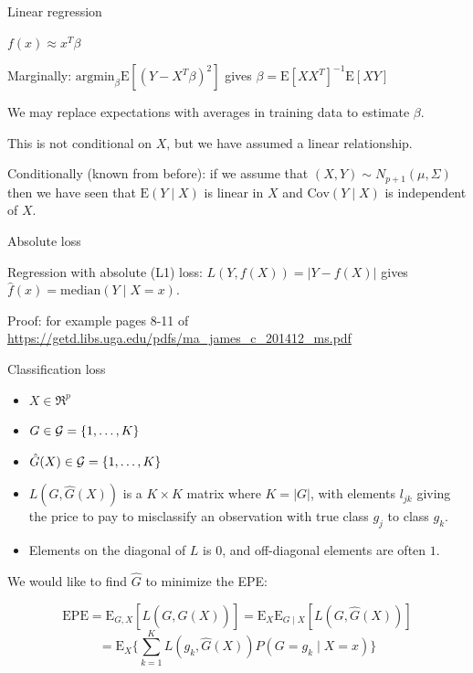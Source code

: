 \documentclass[
  ignorenonframetext,
]{beamer}
\providecommand{\tightlist}{%
  \setlength{\itemsep}{0pt}\setlength{\parskip}{0pt}}
\begin{document}
\begin{frame}

\begin{block}{Linear regression}

\(f(x)\approx x^T \beta\)

Marginally: \(\text{argmin}_{\beta} \text{E}[(Y-X^T\beta)^2]\) gives
\(\beta=\text{E}[X X^T]^{-1}\text{E}[XY]\)

We may replace expectations with averages in training data to estimate
\(\beta\).

This is not conditional on \(X\), but we have assumed a linear
relationship.

Conditionally (known from before): if we assume that
\((X,Y) \sim N_{p+1}(\mu,\Sigma)\) then we have seen that
\(\text{E}(Y\mid X)\) is linear in \(X\) and \(\text{Cov}(Y \mid X)\) is
independent of \(X\).

\end{block}

\end{frame}

\begin{frame}

\begin{block}{Absolute loss}

Regression with absolute (L1) loss: \(L(Y,f(X))=\lvert Y-f(X) \rvert\)
gives \(\hat{f}(x)=\text{median}(Y\mid X=x)\).

Proof: for example pages 8-11 of
\url{https://getd.libs.uga.edu/pdfs/ma_james_c_201412_ms.pdf}

\end{block}

\end{frame}

\begin{frame}

\begin{block}{Classification loss}

\begin{itemize}
\tightlist
\item
  \(X \in \Re^p\)
\item
  \(G \in {\cal G}=\{1,\ldots,K\}\)
\item
  \(\hat{G}(X) \in {\cal G}=\{1,\ldots,K\}\)
\item
  \(L(G,\hat{G}(X))\) is a \(K\times K\) matrix where
  \(K=\lvert G \rvert\), with elements \(l_{jk}\) giving the price to
  pay to misclassify an observation with true class \(g_j\) to class
  \(g_k\).
\item
  Elements on the diagonal of \(L\) is 0, and off-diagonal elements are
  often \(1\).
\end{itemize}

We would like to find \(\hat{G}\) to minimize the EPE:

\[\text{EPE}=\text{E}_{G,X}[L(G,\hat{G}(X))]=\text{E}_X \text{E}_{G\mid X}[L(G,\hat{G}(X))]\]
\[=\text{E}_X \{ \sum_{k=1}^K L(g_k,\hat{G}(X))P(G=g_k \mid X=x) \} \]

\end{block}

\end{frame}
\end{document}
